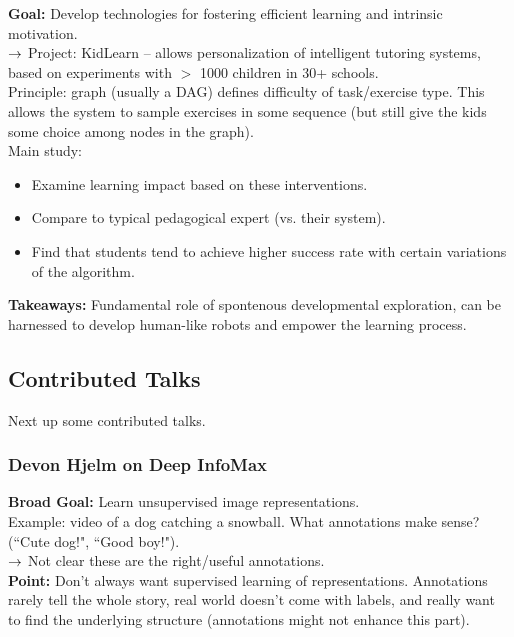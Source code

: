 {\bf Goal:} Develop technologies for fostering efficient learning and intrinsic motivation. \\

$\rightarrow$ Project: KidLearn -- allows personalization of intelligent tutoring systems, based on experiments with $>$ 1000 children in 30+ schools. \\

Principle: graph (usually a DAG) defines difficulty of task/exercise type. This allows the system to sample exercises in some sequence (but still give the kids some choice among nodes in the graph). \\

Main study:
\begin{itemize}
    \item Examine learning impact based on these interventions.
    \item Compare to typical pedagogical expert (vs. their system).
    \item Find that students tend to achieve higher success rate with certain variations of the algorithm.
\end{itemize}

{\bf Takeaways:} Fundamental role of spontenous developmental exploration, can be harnessed to develop human-like robots and empower the learning process.

\subsection{Contributed Talks}
Next up some contributed talks.

\subsubsection{Devon Hjelm on Deep InfoMax~\cite{hjelm2018learning}}

{\bf Broad Goal:} Learn unsupervised image representations. \\

Example: video of a dog catching a snowball. What annotations make sense? (``Cute dog!", ``Good boy!"). \\

$\rightarrow$ Not clear these are the right/useful annotations. \\

{\bf Point:} Don't always want supervised learning of representations. Annotations rarely tell the whole story, real world doesn't come with labels, and really want to find the underlying structure (annotations might not enhance this part). \\

